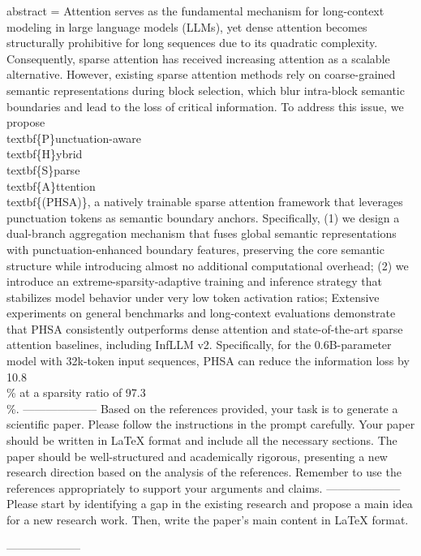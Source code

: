 {      abstract = {Attention serves as the fundamental mechanism for long-context modeling in large language models (LLMs), yet dense attention becomes structurally prohibitive for long sequences due to its quadratic complexity. Consequently, sparse attention has received increasing attention as a scalable alternative. However, existing sparse attention methods rely on coarse-grained semantic representations during block selection, which blur intra-block semantic boundaries and lead to the loss of critical information. To address this issue, we propose \\textbf\{P\}unctuation-aware \\textbf\{H\}ybrid \\textbf\{S\}parse \\textbf\{A\}ttention \\textbf\{(PHSA)\}, a natively trainable sparse attention framework that leverages punctuation tokens as semantic boundary anchors. Specifically, (1) we design a dual-branch aggregation mechanism that fuses global semantic representations with punctuation-enhanced boundary features, preserving the core semantic structure while introducing almost no additional computational overhead; (2) we introduce an extreme-sparsity-adaptive training and inference strategy that stabilizes model behavior under very low token activation ratios; Extensive experiments on general benchmarks and long-context evaluations demonstrate that PHSA consistently outperforms dense attention and state-of-the-art sparse attention baselines, including InfLLM v2. Specifically, for the 0.6B-parameter model with 32k-token input sequences, PHSA can reduce the information loss by 10.8\\\% at a sparsity ratio of 97.3\\\%.}
}
        --------------------
         Based on the references provided, your task is to generate a scientific paper. Please follow the instructions in the prompt carefully. Your paper should be written in LaTeX format and include all the necessary sections. The paper should be well-structured and academically rigorous, presenting a new research direction based on the analysis of the references. Remember to use the references appropriately to support your arguments and claims.
        --------------------
        Please start by identifying a gap in the existing research and propose a main idea for a new research work. Then, write the paper's main content in LaTeX format. 

        --------------------
        
